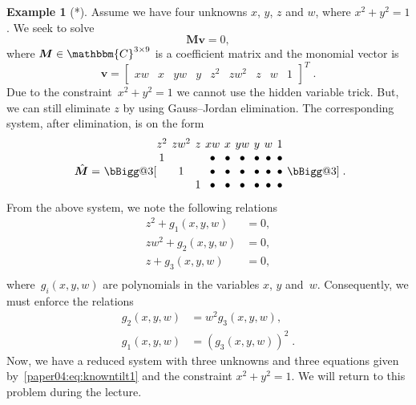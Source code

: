 \documentclass[11pt,a4paper]{article}
\makeatletter
\theoremstyle{definition}
\newtheorem{example}{Example}
\newcommand{\HUGE}{\bBigg@{3}}
\newcommand{\T}{T}
\newcommand{\mat}[1]{\bm{#1}}
\newcommand{\C}{\ensuremath{\mathbbm{C}}}
\makeatother
\begin{document}
\begin{example}[*]
Assume we have four unknowns $x$, $y$, $z$ and $w$, where $x^2+y^2=1$. We seek to solve
\begin{equation}
\mat{M}\mat{v} = 0,
\end{equation}
where $\mat{M}\in\C^{3\times 9}$ is a coefficient matrix and the monomial vector is
\setcounter{MaxMatrixCols}{20}
\begin{equation}
    \mat{v} = \begin{bmatrix}
            xw & x &
            yw & y &
            z^2 & zw^2 & z &
            w & 1
        \end{bmatrix}^\T\;.
\end{equation}
Due to the constraint~$x^2+y^2=1$ we cannot use the hidden variable trick. But, we can still
eliminate $z$ by using Gauss--Jordan elimination. The corresponding system, after elimination, is
on the form
\begin{equation}
\raisebox{-6pt}{ $\hat{\mat{M}} =$ }
\raisebox{-6pt}{\HUGE[}
\begingroup %
\setlength\arraycolsep{2pt}
\begin{matrix}
z^2 & zw^2 & z & xw & x & yw & y & w & 1\\
    1 & & & \bullet & \bullet & \bullet & \bullet & \bullet & \bullet & \\
    & 1 & & \bullet & \bullet & \bullet & \bullet & \bullet & \bullet & \\
    & & 1 & \bullet & \bullet & \bullet & \bullet & \bullet & \bullet &
\end{matrix}
\endgroup
\raisebox{-6pt}{\HUGE]\;.}
\end{equation}
From the above system, we note the following relations
\begin{equation}\label{paper04:eq:elim}
    \begin{aligned}
    z^2 + g_1(x,y,w)  &=  0,\\
    zw^2 + g_2(x,y,w)  &=  0,\\
    z + g_3(x,y,w)  &=  0,\\
    \end{aligned}
\end{equation}
where~$g_i(x,y,w)$ are polynomials in the variables $x$, $y$ and~$w$.
Consequently, we must enforce the relations
\begin{equation}\label{paper04:eq:knowntilt1}
\begin{aligned}
    g_2(x,y,w) &= w^2 g_3(x,y,w), \\
    g_1(x,y,w) &= \left(g_3(x,y,w)\right)^2\;.
\end{aligned}
\end{equation}
Now, we have a reduced system with three unknowns and three equations given
by~\eqref{paper04:eq:knowntilt1} and the constraint $x^2+y^2=1$.
We will return to this problem during the lecture.


\end{example}
\end{document}
